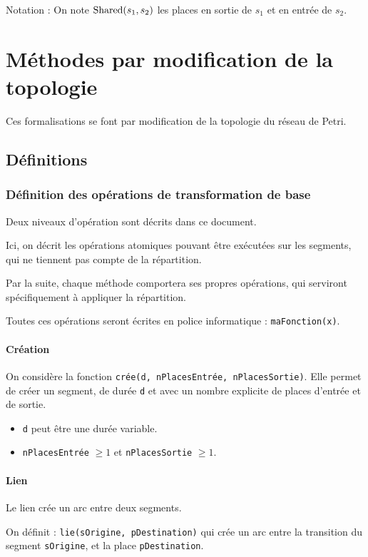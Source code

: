 Notation : On note $\operatorname{Shared}(s_1, s_2)$ les places en sortie de $s_1$ et en entrée de $s_2$.

\section{Méthodes par modification de la topologie}
Ces formalisations se font par modification de la topologie du réseau de Petri.

\subsection{Définitions}

\subsubsection{Définition des opérations de transformation de base}
Deux niveaux d'opération sont décrits dans ce document.

Ici, on décrit les opérations atomiques pouvant être exécutées sur les segments, qui ne tiennent pas compte de la répartition. 

Par la suite, chaque méthode comportera ses propres opérations, qui serviront spécifiquement à appliquer la répartition. 

Toutes ces opérations seront écrites en police informatique : \texttt{maFonction(x)}.

\paragraph{Création}
On considère la fonction \texttt{crée(d, nPlacesEntrée, nPlacesSortie)}. Elle permet de créer un segment, de durée \texttt{d} et avec un nombre explicite de places d'entrée et de sortie.

\begin{itemize}
\item \texttt{d} peut être une durée variable.
\item \texttt{nPlacesEntrée} $ \geq 1 $ et \texttt{nPlacesSortie} $ \geq 1 $.
\end{itemize}
\paragraph{Lien}
Le lien crée un arc entre deux segments.

On définit : \texttt{lie(sOrigine, pDestination)} qui crée un arc entre la transition du segment \texttt{sOrigine}, et la place \texttt{pDestination}.

